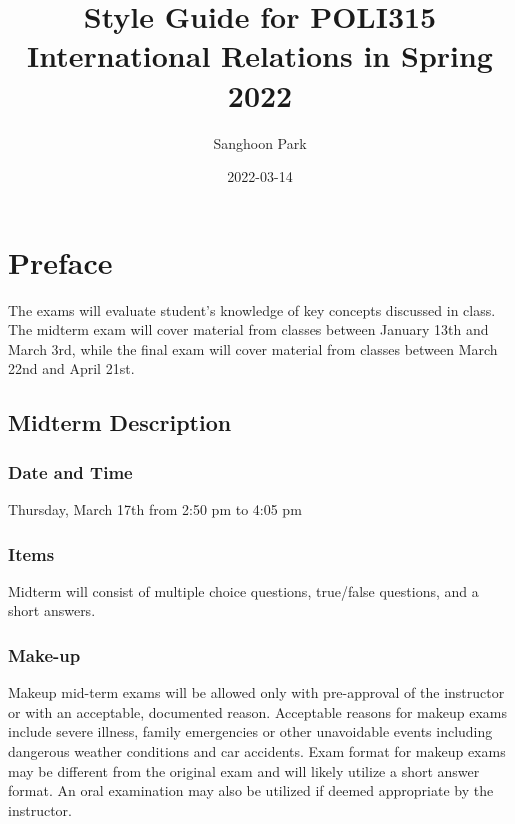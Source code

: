 \documentclass[
]{book}
\title{Style Guide for POLI315 International Relations in Spring 2022}
\author{Sanghoon Park}
\date{2022-03-14}
\begin{document}
\maketitle

{
\setcounter{tocdepth}{1}
\tableofcontents
}
\hypertarget{preface}{%
\chapter*{Preface}\label{preface}}

The exams will evaluate student's knowledge of key concepts discussed in class. The midterm exam will cover material from classes between January 13th and March 3rd, while the final exam will cover material from classes between March 22nd and April 21st.

\hypertarget{midterm-description}{%
\section*{Midterm Description}\label{midterm-description}}

\hypertarget{date-and-time}{%
\subsection*{Date and Time}\label{date-and-time}}

Thursday, March 17th from 2:50 pm to 4:05 pm

\hypertarget{items}{%
\subsection*{Items}\label{items}}

Midterm will consist of multiple choice questions, true/false questions, and a short answers.

\hypertarget{make-up}{%
\subsection*{Make-up}\label{make-up}}

Makeup mid-term exams will be allowed only with pre-approval of the instructor or with an acceptable, documented reason. Acceptable reasons for makeup exams include severe illness, family emergencies or other unavoidable events including dangerous weather conditions and car accidents. Exam format for makeup exams may be different from the original exam and will likely utilize a short answer format. An oral examination may also be utilized if deemed appropriate by the instructor.
\end{document}
